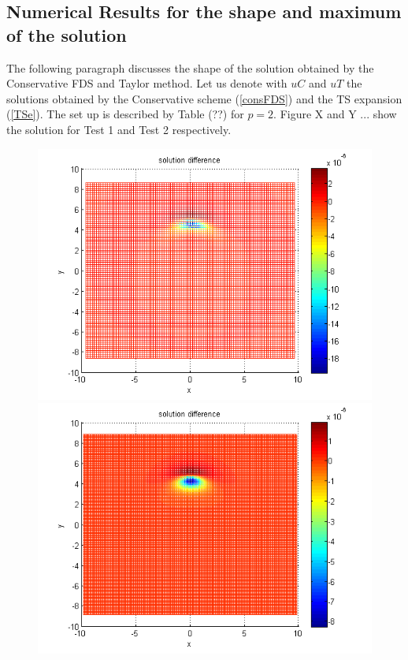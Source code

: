 \documentclass[%
 aip,
cp,  %
 amsmath,amssymb,%
 reprint,%
]{revtex4-2}
\newcommand{\rf}[1]{(\ref{#1})}
\begin{document}
\subsection{Numerical Results for the shape and maximum of the solution}

The following paragraph discusses the shape of the solution obtained by the Conservative FDS and Taylor method. Let us denote with $uC$ and $uT$ the solutions obtained by the Conservative scheme \rf{consFDS} and the TS expansion \rf{TSe}. The set up is described by Table (??) for $p=2$. Figure X and Y ... show the solution for Test 1 and Test 2 respectively.
\begin{figure}[ht]\vspace{0.4cm}
	\begin{minipage}[b]{0.32\linewidth}
		 \includegraphics[width=\linewidth]{figures/compare_30_bt3_c045_h020.png}
	\end{minipage}	
	\begin{minipage}[b]{0.32\linewidth}
		\includegraphics[width=\linewidth]{figures/compare_30_bt3_c045_h010.png}

\end{minipage}
\end{figure}
\end{document}
